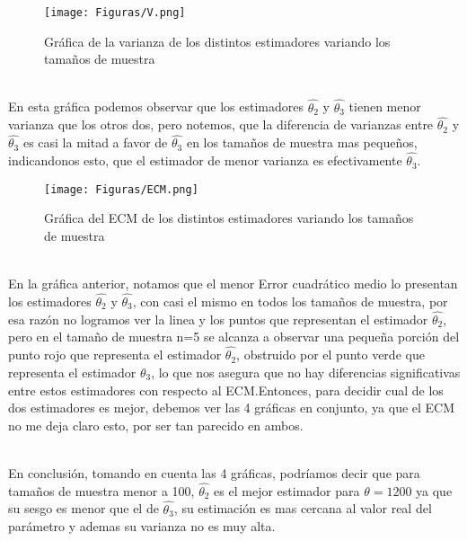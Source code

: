 \documentclass[letterpaper,12pt,onecolumn,titlepage]{article}
\begin{document}
\pagebreak \begin{figure}[!h]
    \begin{center}
        \texttt{[image: Figuras/V.png]}
        \caption{Gr\'{a}fica de la varianza de los distintos estimadores variando los tama\~{n}os de muestra}
        \label{fig:Densidad}
    \end{center}
\end{figure}
~\\ En esta gr\'{a}fica podemos observar que los estimadores $\hat{\theta_2}$ y $\hat{\theta_3}$ tienen menor varianza que los otros dos, pero notemos, que la diferencia de varianzas entre $\hat{\theta_2}$ y $\hat{\theta_3}$ es casi la mitad a favor de $\hat{\theta_3}$ en los tama\~{n}os de muestra mas peque\~{n}os, indicandonos esto, que el estimador de menor varianza es efectivamente $\hat{\theta_3}$.
\pagebreak \begin{figure}[!h]
    \begin{center}
        \texttt{[image: Figuras/ECM.png]}
        \caption{Gr\'{a}fica del ECM de los distintos estimadores variando los tama\~{n}os de muestra}
        \label{fig:Densidad}
    \end{center}
\end{figure}
~\\ En la gr\'{a}fica anterior, notamos que el menor Error cuadr\'{a}tico medio lo presentan los estimadores $\hat{\theta_2}$ y $\hat{\theta_3}$, con casi el mismo en todos los tama\~{n}os de muestra, por esa raz\'{o}n no logramos ver la linea y los puntos que representan el estimador $\hat{\theta_2}$, pero en el tama\~{n}o de muestra n=5 se alcanza a observar una peque\~{n}a porci\'{o}n del punto rojo que representa el estimador $\hat{\theta_2}$, obstruido por el punto verde que representa el estimador $\hat{\theta_3}$, lo que nos asegura que no hay diferencias significativas entre estos estimadores con respecto al ECM.Entonces, para decidir cual de los dos estimadores es mejor, debemos ver las 4 gr\'{a}ficas en conjunto, ya que el ECM no me deja claro esto, por ser tan parecido en ambos.

~\\ En conclusi\'{o}n, tomando en cuenta las 4 gr\'{a}ficas, podr\'{i}amos decir que para tama\~{n}os de muestra menor a 100, $\hat{\theta_2}$ es el mejor estimador para $\theta=1200$ ya que su sesgo es menor que el de $\hat{\theta_3}$, su estimaci\'{o}n es mas cercana al valor real del par\'{a}metro y ademas su varianza no es muy alta. 
\end{document}
